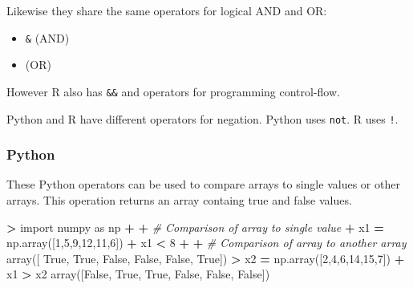 \documentclass[
]{book}
\newenvironment{Shaded}{\begin{snugshade}}{\end{snugshade}}
\newcommand{\CommentTok}[1]{\textcolor[rgb]{0.56,0.35,0.01}{\textit{#1}}}
\newcommand{\DecValTok}[1]{\textcolor[rgb]{0.00,0.00,0.81}{#1}}
\newcommand{\ImportTok}[1]{#1}
\newcommand{\NormalTok}[1]{#1}
\newcommand{\OperatorTok}[1]{\textcolor[rgb]{0.81,0.36,0.00}{\textbf{#1}}}
\newcommand{\VariableTok}[1]{\textcolor[rgb]{0.00,0.00,0.00}{#1}}
\providecommand{\tightlist}{%
  \setlength{\itemsep}{0pt}\setlength{\parskip}{0pt}}
\begin{document}
Likewise they share the same operators for logical AND and OR:

\begin{itemize}
\tightlist
\item
  \texttt{\&} (AND)
\item
  \texttt{\textbar{}} (OR)
\end{itemize}

However R also has \texttt{\&\&} and \texttt{\textbar{}\textbar{}} operators for programming control-flow.

Python and R have different operators for negation. Python uses \texttt{not}. R uses \texttt{!}.

\hypertarget{python-4}{%
\subsubsection*{Python}\label{python-4}}

These Python operators can be used to compare arrays to single values or other arrays. This operation returns an array containg true and false values.

\begin{Shaded}
\begin{Highlighting}[]
\OperatorTok{\textgreater{}} \ImportTok{import}\NormalTok{ numpy }\ImportTok{as}\NormalTok{ np }
\OperatorTok{+} 
\OperatorTok{+} \CommentTok{\# Comparison of array to single value}
\OperatorTok{+}\NormalTok{ x1 }\OperatorTok{=}\NormalTok{ np.array([}\DecValTok{1}\NormalTok{,}\DecValTok{5}\NormalTok{,}\DecValTok{9}\NormalTok{,}\DecValTok{12}\NormalTok{,}\DecValTok{11}\NormalTok{,}\DecValTok{6}\NormalTok{])}
\OperatorTok{+}\NormalTok{ x1 }\OperatorTok{\textless{}} \DecValTok{8}
\OperatorTok{+} 
\OperatorTok{+} \CommentTok{\# Comparison of array to another array }
\NormalTok{array([ }\VariableTok{True}\NormalTok{,  }\VariableTok{True}\NormalTok{, }\VariableTok{False}\NormalTok{, }\VariableTok{False}\NormalTok{, }\VariableTok{False}\NormalTok{,  }\VariableTok{True}\NormalTok{])}
\OperatorTok{\textgreater{}}\NormalTok{ x2 }\OperatorTok{=}\NormalTok{ np.array([}\DecValTok{2}\NormalTok{,}\DecValTok{4}\NormalTok{,}\DecValTok{6}\NormalTok{,}\DecValTok{14}\NormalTok{,}\DecValTok{15}\NormalTok{,}\DecValTok{7}\NormalTok{])}
\OperatorTok{+}\NormalTok{ x1 }\OperatorTok{\textgreater{}}\NormalTok{ x2}
\NormalTok{array([}\VariableTok{False}\NormalTok{,  }\VariableTok{True}\NormalTok{,  }\VariableTok{True}\NormalTok{, }\VariableTok{False}\NormalTok{, }\VariableTok{False}\NormalTok{, }\VariableTok{False}\NormalTok{])}
\end{Highlighting}
\end{Shaded}
\end{document}
